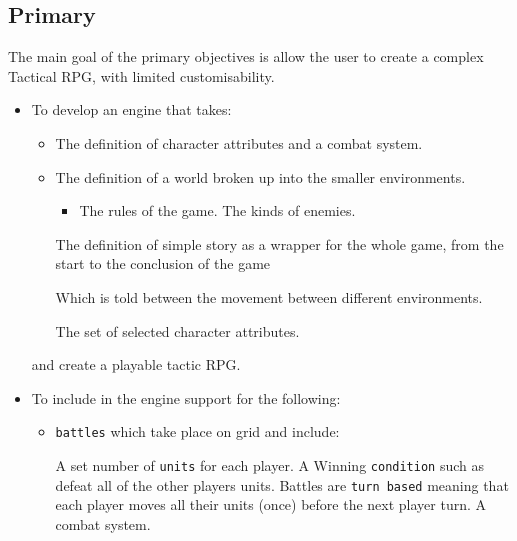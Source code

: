 \subsection{Primary}
\label{primary}
The main goal of the primary objectives is allow the user to create a complex Tactical RPG, with limited customisability.  
\begin{itemize}
\item To develop an engine that takes:
\begin{itemize}

 \item The definition of character attributes and a combat system.
	\item The definition of a world broken up into the smaller environments.
	\begin{itemize}
		\item The rules of the game.
		\cross The kinds of enemies.
	\end{itemize}
	
	\tick The definition of simple story as a wrapper for the whole game, from the start to the conclusion of the game
	\begin{itemize}
		\cross Which is told between the movement between different environments.
	\end{itemize}
	                        
	\cross The set of selected character attributes.
	
\end{itemize}
and create a playable tactic RPG.

\item To include in the engine support for the following:
\begin{itemize}
	\tick \texttt{units} with a fixed set of associated attributes such as:
	\begin{itemize}
		\tick Hit-points (which represent the health of the unit).
		\tick Strength.
		\tick Defence.
		\tick Move (The number of tiles the unit can move each turn).
	\end{itemize}
	
	\item \texttt{battles} which take place on grid and include:
	\begin{itemize}
		\tick  A set number of \texttt{units} for each player.
		\cross A Winning \texttt{condition} such as defeat all of the other players units.
		\tick  Battles are \texttt{turn based} meaning that each player moves all their units (once) before the next player turn.   
		\cross A combat system.
	\end{itemize}
	

\end{itemize}
\end{itemize}
